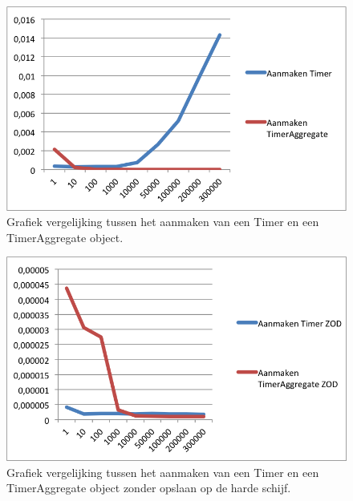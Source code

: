 \begin{figure}[!h]
  \centering
  \includegraphics[scale=1.0]{Afbeeldingen/Evaluatie/TimerVSAggregate}
  \caption{Grafiek vergelijking tussen het aanmaken van een Timer en een TimerAggregate object.}
  \label{fig:TimerVSAggregate}
\end{figure}

\begin{figure}[!h]
  \centering
  \includegraphics[scale=1.0]{Afbeeldingen/Evaluatie/TimerVSAggregateZOD}
  \caption{Grafiek vergelijking tussen het aanmaken van een Timer en een TimerAggregate object zonder opslaan op de harde schijf.}
  \label{fig:TimerVSAggregateZOD}
\end{figure}

